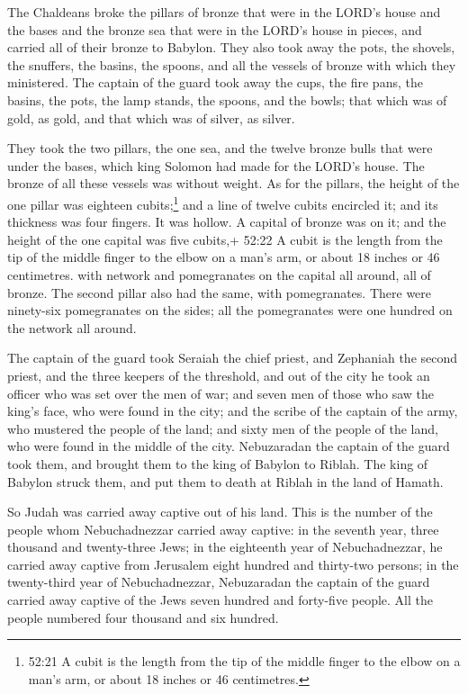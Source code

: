  The Chaldeans broke the pillars of bronze that were in the
LORD's house and the bases and the bronze sea that were in the LORD's
house in pieces, and carried all of their bronze to Babylon.
 They also took away the pots, the shovels, the snuffers,
the basins, the spoons, and all the vessels of bronze with which they
ministered.  The captain of the guard took away the cups,
the fire pans, the basins, the pots, the lamp stands, the spoons, and
the bowls; that which was of gold, as gold, and that which was of
silver, as silver.

 They took the two pillars, the one sea, and the twelve
bronze bulls that were under the bases, which king Solomon had made for
the LORD's house. The bronze of all these vessels was without weight.
 As for the pillars, the height of the one pillar was
eighteen cubits;\footnote{52:21 A cubit is the length from the tip of
  the middle finger to the elbow on a man's arm, or about 18 inches or
  46 centimetres.} and a line of twelve cubits encircled it; and its
thickness was four fingers. It was hollow.  A capital of
bronze was on it; and the height of the one capital was five cubits,+
52:22 A cubit is the length from the tip of the middle finger to the
elbow on a man's arm, or about 18 inches or 46 centimetres. with network
and pomegranates on the capital all around, all of bronze. The second
pillar also had the same, with pomegranates.  There were
ninety-six pomegranates on the sides; all the pomegranates were one
hundred on the network all around.

 The captain of the guard took Seraiah the chief priest,
and Zephaniah the second priest, and the three keepers of the threshold,
 and out of the city he took an officer who was set over
the men of war; and seven men of those who saw the king's face, who were
found in the city; and the scribe of the captain of the army, who
mustered the people of the land; and sixty men of the people of the
land, who were found in the middle of the city. 
Nebuzaradan the captain of the guard took them, and brought them to the
king of Babylon to Riblah.  The king of Babylon struck
them, and put them to death at Riblah in the land of Hamath.

So Judah was carried away captive out of his land.  This is
the number of the people whom Nebuchadnezzar carried away captive: in
the seventh year, three thousand and twenty-three Jews;  in
the eighteenth year of Nebuchadnezzar, he carried away captive from
Jerusalem eight hundred and thirty-two persons;  in the
twenty-third year of Nebuchadnezzar, Nebuzaradan the captain of the
guard carried away captive of the Jews seven hundred and forty-five
people. All the people numbered four thousand and six hundred.


